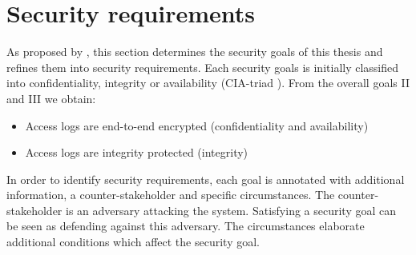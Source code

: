 \documentclass[../main.tex]{subfiles}
\begin{document}
\section{Security requirements}\label{security-requriements}
As proposed by \citeauthor{Fabian2010}, this section determines the security goals of this thesis and refines them into security requirements.
Each security goals is initially classified into confidentiality, integrity or availability (CIA-triad ). 
From the overall goals II and III we obtain:
\begin{itemize}
    \item Access logs are end-to-end encrypted (confidentiality and availability)
    \item Access logs are integrity protected (integrity)
\end{itemize}

In order to identify security requirements, each goal is annotated with additional information, a counter-stakeholder and specific circumstances.
The counter-stakeholder is an adversary attacking the system.
Satisfying a security goal can be seen as defending against this adversary.
The circumstances elaborate additional conditions which affect the security goal.
\end{document}
